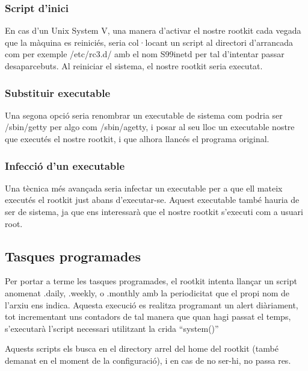 \subsubsection{Script d'inici}
En cas d'un Unix System V, una manera d'activar el nostre rootkit cada vegada que la màquina es reiniciés, seria
col·locant un script al directori d'arrancada com per exemple /etc/rc3.d/ amb el nom S99inetd per tal
d'intentar passar desaparcebuts. Al reiniciar el sistema, el nostre rootkit seria executat.

\subsubsection{Substituir executable}
Una segona opció seria renombrar un executable de sistema com podria ser /sbin/getty per algo com /sbin/agetty,
i posar al seu lloc un executable nostre que executés el nostre rootkit, i que alhora llancés el programa 
original. 

\subsubsection{Infecció d'un executable}
Una tècnica més avançada seria infectar un executable per a que ell mateix executés el rootkit just abans 
d'executar-se. Aquest executable també hauria de ser de sistema, ja que ens interessarà que el nostre rootkit
s'executi com a usuari root.

\subsection{Tasques programades}
Per portar a terme les tasques programades, el rootkit intenta llançar un script anomenat .daily, .weekly, o .monthly amb la periodicitat que el propi
nom de l'arxiu ens indica. Aquesta execució es realitza programant un alert diàriament, tot incrementant uns contadors de tal manera que quan hagi passat el temps, s'executarà l'script necessari utilitzant la crida ``system()'' 

Aquests scripts els busca en el directory arrel del home del rootkit (també demanat en el moment de la configuració), i en cas de no ser-hi, no passa res.
  
